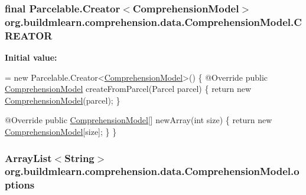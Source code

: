 \subsubsection[{\texorpdfstring{C\+R\+E\+A\+T\+OR}{CREATOR}}]{\setlength{\rightskip}{0pt plus 5cm}final Parcelable.\+Creator$<${\bf Comprehension\+Model}$>$ org.\+buildmlearn.\+comprehension.\+data.\+Comprehension\+Model.\+C\+R\+E\+A\+T\+OR}\hypertarget{classorg_1_1buildmlearn_1_1comprehension_1_1data_1_1ComprehensionModel_af19440431a4796389d2f724a85ef7337}{}\label{classorg_1_1buildmlearn_1_1comprehension_1_1data_1_1ComprehensionModel_af19440431a4796389d2f724a85ef7337}
{\bfseries Initial value\+:}
\begin{DoxyCode}
= \textcolor{keyword}{new} Parcelable.Creator<\hyperlink{classorg_1_1buildmlearn_1_1comprehension_1_1data_1_1ComprehensionModel_a4d6913ed3ec02998b73f1adefb476dab}{ComprehensionModel}>() \{
        @Override
        \textcolor{keyword}{public} \hyperlink{classorg_1_1buildmlearn_1_1comprehension_1_1data_1_1ComprehensionModel_a4d6913ed3ec02998b73f1adefb476dab}{ComprehensionModel} createFromParcel(Parcel parcel) \{
            \textcolor{keywordflow}{return} \textcolor{keyword}{new} \hyperlink{classorg_1_1buildmlearn_1_1comprehension_1_1data_1_1ComprehensionModel_a4d6913ed3ec02998b73f1adefb476dab}{ComprehensionModel}(parcel);
        \}

        @Override
        \textcolor{keyword}{public} \hyperlink{classorg_1_1buildmlearn_1_1comprehension_1_1data_1_1ComprehensionModel_a4d6913ed3ec02998b73f1adefb476dab}{ComprehensionModel}[] newArray(\textcolor{keywordtype}{int} size) \{
            \textcolor{keywordflow}{return} \textcolor{keyword}{new} \hyperlink{classorg_1_1buildmlearn_1_1comprehension_1_1data_1_1ComprehensionModel_a4d6913ed3ec02998b73f1adefb476dab}{ComprehensionModel}[size];
        \}
    \}
\end{DoxyCode}
\subsubsection[{\texorpdfstring{options}{options}}]{\setlength{\rightskip}{0pt plus 5cm}Array\+List$<$String$>$ org.\+buildmlearn.\+comprehension.\+data.\+Comprehension\+Model.\+options\hspace{0.3cm}{\ttfamily [private]}}\hypertarget{classorg_1_1buildmlearn_1_1comprehension_1_1data_1_1ComprehensionModel_a553764471ee458e9f5b8808fc24382c3}{}\label{classorg_1_1buildmlearn_1_1comprehension_1_1data_1_1ComprehensionModel_a553764471ee458e9f5b8808fc24382c3}
